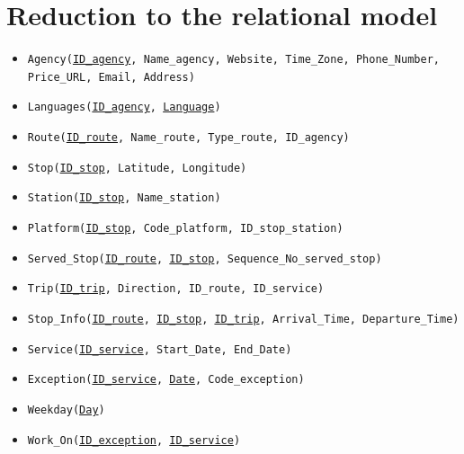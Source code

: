 \documentclass[a4paper, 12pt]{article}
\begin{document}
\section{Reduction to the relational model} \label{sec:5}
\begin{itemize}
    \item \texttt{Agency(\underline{ID\_agency}, Name\_agency, Website, Time\_Zone, Phone\_Number, Price\_URL, Email, Address)}
    \item \texttt{Languages(\underline{ID\_agency}, \underline{Language})}
    \item \texttt{Route(\underline{ID\_route}, Name\_route, Type\_route, ID\_agency)}
    \item \texttt{Stop(\underline{ID\_stop}, Latitude, Longitude)}
    \item \texttt{Station(\underline{ID\_stop}, Name\_station)}
    \item \texttt{Platform(\underline{ID\_stop}, Code\_platform, ID\_stop\_station)}
    \item \texttt{Served\_Stop(\underline{ID\_route}, \underline{ID\_stop}, Sequence\_No\_served\_stop)}
    \item \texttt{Trip(\underline{ID\_trip}, Direction, ID\_route, ID\_service)}
    \item \texttt{Stop\_Info(\underline{ID\_route}, \underline{ID\_stop}, \underline{ID\_trip}, Arrival\_Time, Departure\_Time)} %
    \item \texttt{Service(\underline{ID\_service}, Start\_Date, End\_Date)}
    \item \texttt{Exception(\underline{ID\_service}, \underline{Date}, Code\_exception)}
    \item \texttt{Weekday(\underline{Day})}

    \item \texttt{Work\_On(\underline{ID\_exception}, \underline{ID\_service})} %
\end{itemize}

    
\end{document}

